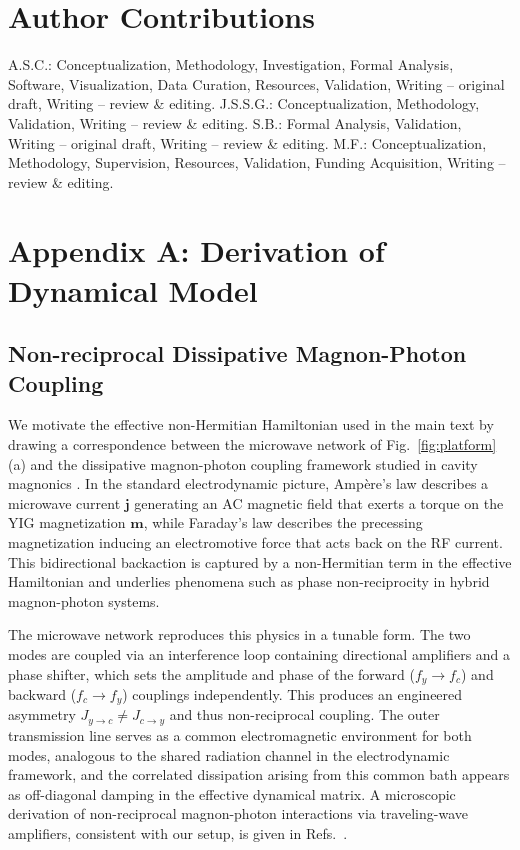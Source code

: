 \documentclass[%
  reprint,
  amsmath,amssymb,
  aps,
  prapplied,
  superscriptaddress,
  longbibliography]{revtex4-2}
\begin{document}
\section{\label{sec:author_contributions} Author Contributions}

A.S.C.: Conceptualization, Methodology, Investigation, Formal Analysis, Software, Visualization, Data Curation, Resources, Validation, Writing – original draft, Writing – review \& editing.
J.S.S.G.: Conceptualization, Methodology, Validation, Writing – review \& editing.
S.B.: Formal Analysis, Validation, Writing – original draft, Writing – review \& editing.
M.F.: Conceptualization, Methodology, Supervision, Resources, Validation, Funding Acquisition, Writing – review \& editing.


\section{\label{appendix:a} Appendix A: Derivation of Dynamical Model}

\subsection{Non-reciprocal Dissipative Magnon-Photon Coupling}

We motivate the effective non-Hermitian Hamiltonian used in the main text by drawing a correspondence between the microwave network of Fig.~\ref{fig:platform}(a) and the dissipative magnon-photon coupling framework studied in cavity magnonics \cite{wang_dissipative_2020, fang_generalized_2017, wang_nonreciprocity_2019, clerk_introduction_2022}. In the standard electrodynamic picture, Amp\`{e}re's law describes a microwave current $\mathbf{j}$ generating an AC magnetic field that exerts a torque on the YIG magnetization $\mathbf{m}$, while Faraday's law describes the precessing magnetization inducing an electromotive force that acts back on the RF current. This bidirectional backaction is captured by a non-Hermitian term in the effective Hamiltonian and underlies phenomena such as phase non-reciprocity in hybrid magnon-photon systems.

The microwave network reproduces this physics in a tunable form. The two modes are coupled via an interference loop containing directional amplifiers and a phase shifter, which sets the amplitude and phase of the forward ($f_y \to f_c$) and backward ($f_c \to f_y$) couplings independently. This produces an engineered asymmetry $J_{y\to c} \neq J_{c\to y}$ and thus non-reciprocal coupling. The outer transmission line serves as a common electromagnetic environment for both modes, analogous to the shared radiation channel in the electrodynamic framework, and the correlated dissipation arising from this common bath appears as off-diagonal damping in the effective dynamical matrix. A microscopic derivation of non-reciprocal magnon-photon interactions via traveling-wave amplifiers, consistent with our setup, is given in Refs.~\cite{yao_microscopic_2019, metelmann_nonreciprocal_2015}.
\end{document}
